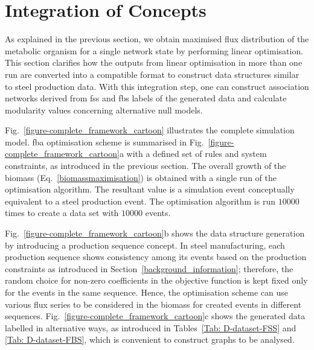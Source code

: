 \section{Integration of Concepts}
As explained in the previous section, we obtain maximised flux distribution of the metabolic organism for a single network state by performing linear optimisation. This section clarifies how the outputs from linear optimisation in more than one run are converted into a compatible format to construct data structures similar to steel production data. With this integration step, one can construct association networks derived from \acs{fss} and \acs{fbs} labels of the generated data and calculate modularity values concerning alternative null models.



Fig.~\ref{figure-complete_framework_cartoon} illustrates the complete simulation model. \acs{fba} optimisation scheme is summarised in Fig.~\ref{figure-complete_framework_cartoon}a with a defined set of rules and system constraints, as introduced in the previous section. The overall growth of the biomass (Eq.~\eqref{biomassmaximisation}) is obtained with a single run of the optimisation algorithm. The resultant value is a simulation event conceptually equivalent to a steel production event. The optimisation algorithm is run $10000$ times to create a data set with $10000$ events. 

Fig.~\ref{figure-complete_framework_cartoon}b shows the data structure generation by introducing a production sequence concept. In steel manufacturing, each production sequence shows consistency among its events based on the production constraints as introduced in Section~\ref{background_information}; therefore, the random choice for non-zero coefficients in the objective function is kept fixed only for the events in the same sequence. Hence, the optimisation scheme can use various flux series to be considered in the biomass for created events in different sequences. Fig.~\ref{figure-complete_framework_cartoon}c shows the generated data labelled in alternative ways, as introduced in Tables~\ref{Tab: D-dataset-FSS} and \ref{Tab: D-dataset-FBS}, which is convenient to construct graphs to be analysed.